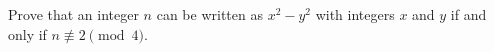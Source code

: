 Prove that an integer $n$ can be written as $x^2-y^2$ with integers $x$ and $y$ if and only if $n\not\equiv2\pmod4$.
